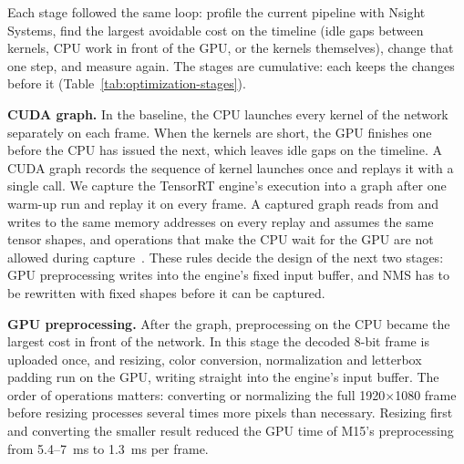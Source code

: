 Each stage followed the same loop: profile the current pipeline with Nsight
Systems, find the largest avoidable cost on the timeline (idle gaps between
kernels, CPU work in front of the GPU, or the kernels themselves), change
that one step, and measure again. The stages are cumulative: each keeps the
changes before it (Table~\ref{tab:optimization-stages}).

\textbf{CUDA graph.} In the baseline, the CPU launches every kernel of the
network separately on each frame. When the kernels are short, the GPU
finishes one before the CPU has issued the next, which leaves idle gaps on
the timeline. A CUDA graph records the sequence of kernel launches once and
replays it with a single call. We capture the TensorRT engine's execution
into a graph after one warm-up run and replay it on every frame. A captured
graph reads from and writes to the same memory addresses on every replay and
assumes the same tensor shapes, and operations that make the CPU wait for the
GPU are not allowed during capture~\cite{pytorch-cuda-graphs}. These rules
decide the design of the next two stages: GPU preprocessing writes into the
engine's fixed input buffer, and NMS has to be rewritten with fixed shapes
before it can be captured.

\textbf{GPU preprocessing.} After the graph, preprocessing on the CPU became
the largest cost in front of the network. In this stage the decoded 8-bit
frame is uploaded once, and resizing, color conversion, normalization and
letterbox padding run on the GPU, writing straight into the engine's input
buffer. The order of operations matters: converting or normalizing the full
1920$\times$1080 frame before resizing processes several times more pixels
than necessary. Resizing first and converting the smaller result reduced the
GPU time of M15's preprocessing from 5.4--7~ms to 1.3~ms per frame.

